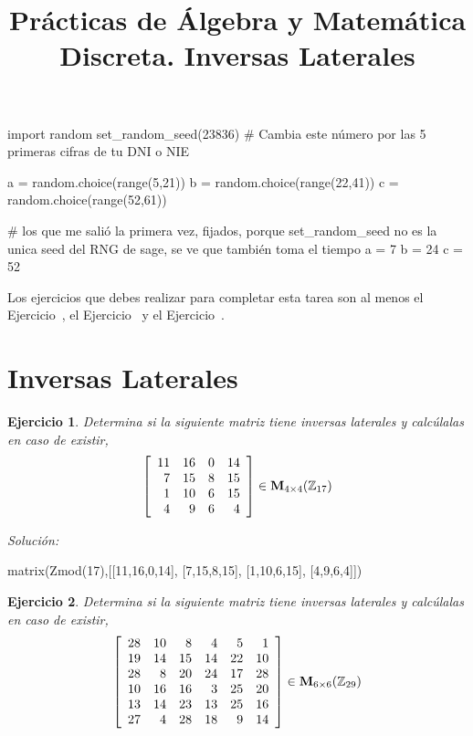 \documentclass{amsart}
\title{Pr\'acticas de \'Algebra y Matem\'atica Discreta. Inversas Laterales}
\newtheorem{ejer}{Ejercicio}
\begin{document}
\maketitle

\begin{sagesilent}
import random
set_random_seed(23836) # Cambia este número por las 5 primeras cifras de tu DNI o NIE

a = random.choice(range(5,21))
b = random.choice(range(22,41))
c = random.choice(range(52,61))

# los que me salió la primera vez, fijados, porque set_random_seed no es la unica seed del RNG de sage, se ve que también toma el tiempo
a = 7
b = 24
c = 52
\end{sagesilent}

\begin{tcolorbox}[colback = red!40!white]
Los ejercicios que debes realizar para completar esta tarea son al menos el Ejercicio~,
el Ejercicio~ y el Ejercicio~.
\end{tcolorbox}

\section{Inversas Laterales}

\begin{ejer} Determina si la siguiente matriz tiene inversas laterales y calc\'ulalas en caso de existir,
\[ \left[\begin{array}{rrrr}
11 & 16 & 0 & 14 \\
7 & 15 & 8 & 15 \\
1 & 10 & 6 & 15 \\
4 & 9 & 6 & 4
\end{array}\right] \in {\bf M}_{4\times 4}({\mathbb Z}_{17})\]
\end{ejer}

{\it Soluci\'on:}

\begin{sageblock}
matrix(Zmod(17),[[11,16,0,14],
[7,15,8,15],
[1,10,6,15],
[4,9,6,4]])
\end{sageblock}



\begin{ejer} Determina si la siguiente matriz tiene inversas laterales y calc\'ulalas en caso de existir,
\[ \left[\begin{array}{rrrrrr}
28 & 10 & 8 & 4 & 5 & 1 \\
19 & 14 & 15 & 14 & 22 & 10 \\
28 & 8 & 20 & 24 & 17 & 28 \\
10 & 16 & 16 & 3 & 25 & 20 \\
13 & 14 & 23 & 13 & 25 & 16 \\
27 & 4 & 28 & 18 & 9 & 14
\end{array}\right] \in {\bf M}_{6\times 6}({\mathbb Z}_{29})\]
\end{ejer}
\end{document}
